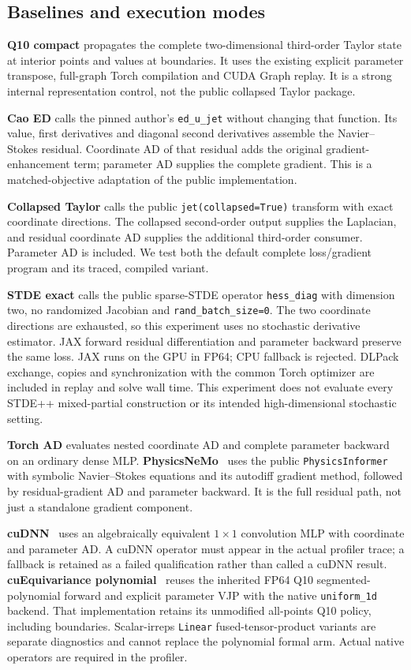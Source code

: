 \documentclass[11pt]{article}
\begin{document}
\subsection{Baselines and execution modes}
\textbf{Q10 compact} propagates the complete two-dimensional third-order
Taylor state at interior points and values at boundaries. It uses the
existing explicit parameter transpose, full-graph Torch compilation and
CUDA Graph replay. It is a strong internal representation control, not the
public collapsed Taylor package.

\textbf{Cao ED} calls the pinned author's \texttt{ed\_u\_jet} without changing
that function. Its value, first derivatives and diagonal second derivatives
assemble the Navier--Stokes residual. Coordinate AD of that residual adds
the original gradient-enhancement term; parameter AD supplies the complete
gradient. This is a matched-objective adaptation of the public implementation.

\textbf{Collapsed Taylor} calls the public \texttt{jet(collapsed=True)}
transform with exact coordinate directions. The collapsed second-order
output supplies the Laplacian, and residual coordinate AD supplies the
additional third-order consumer. Parameter AD is included. We test both the
default complete loss/gradient program and its traced, compiled variant.

\textbf{STDE exact} calls the public sparse-STDE operator
\texttt{hess\_diag} with dimension two, no randomized Jacobian and
\texttt{rand\_batch\_size=0}.
The two coordinate directions are exhausted, so this experiment uses no
stochastic derivative estimator. JAX forward residual differentiation and
parameter backward preserve the same loss. JAX runs on the GPU in FP64;
CPU fallback is rejected. DLPack exchange, copies and synchronization with
the common Torch optimizer are included in replay and solve wall time.
This experiment does not evaluate every STDE++ mixed-partial construction
or its intended high-dimensional stochastic setting.

\textbf{Torch AD} evaluates nested coordinate AD and complete parameter
backward on an ordinary dense MLP. \textbf{PhysicsNeMo}~\cite{physicsnemo} uses the public
\texttt{PhysicsInformer} with symbolic Navier--Stokes equations and its
autodiff gradient method, followed by residual-gradient AD and parameter
backward. It is the full residual path, not just a standalone gradient
component.

\textbf{cuDNN}~\cite{cudnn} uses an algebraically equivalent $1\times1$ convolution MLP
with coordinate and parameter AD. A cuDNN operator must appear in the actual
profiler trace; a fallback is retained as a failed qualification rather than
called a cuDNN result. \textbf{cuEquivariance polynomial}~\cite{cueq} reuses the inherited
FP64 Q10 segmented-polynomial forward and explicit parameter VJP with the
native \texttt{uniform\_1d} backend. That implementation retains its
unmodified all-points Q10 policy, including boundaries. Scalar-irreps
\texttt{Linear} fused-tensor-product variants are separate diagnostics and
cannot replace the polynomial formal arm. Actual native operators are
required in the profiler.
\end{document}
